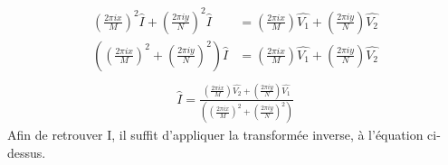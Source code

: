 \begin{equation}
\begin{aligned}
\left(\frac{2\pi i x}{M}\right)^2 \widehat{I}+\left(\frac{2\pi i y}{N}\right)^2 \widehat{I} & = \left(\frac{2\pi i x}{M}\right) \widehat{V_1}+\left(\frac{2\pi i y}{N}\right) \widehat{V_2}\\
\left(\left(\frac{2\pi i x}{M}\right)^2+\left(\frac{2\pi i y}{N}\right)^2\right) \widehat{I} & = \left(\frac{2\pi i x}{M}\right) \widehat{ V_1}+\left(\frac{2\pi i y}{N}\right) \widehat{V_2}\\
\end{aligned}
\end{equation}
\begin{equation}
\begin{aligned}
\widehat{I} = \frac{\left(\frac{2\pi i x}{M}\right) \widehat{ V_2}+\left(\frac{2\pi i y}{N}\right) \widehat{V_1}}{\left(\left(\frac{2\pi i x}{M}\right)^2+\left(\frac{2\pi i y}{N}\right)^2\right)}
\end{aligned}
\end{equation}
Afin de retrouver I, il suffit d'appliquer la transformée inverse, à l'équation ci-dessus.
